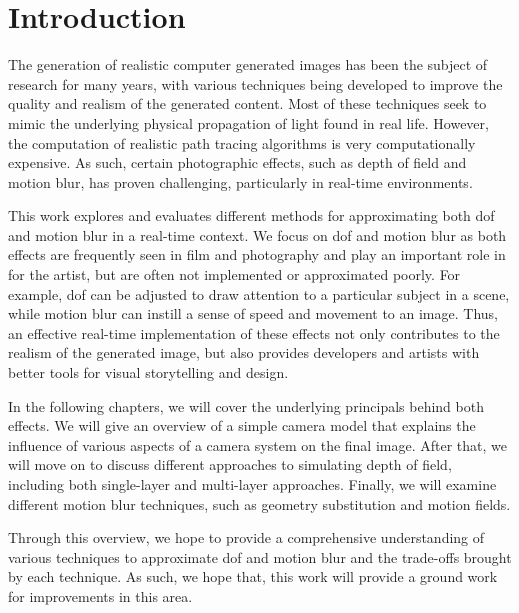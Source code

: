 \chapter{Introduction}
\label{ch:Introduction}
The generation of realistic computer generated images has been the subject of research for many years, with various techniques being developed to improve the quality and realism of the generated content.
Most of these techniques seek to mimic the underlying physical propagation of light found in real life.
However, the computation of realistic path tracing algorithms is very computationally expensive.
As such, certain photographic effects, such as depth of field and motion blur, has proven challenging, particularly in real-time environments.

This work explores and evaluates different methods for approximating both \gls{dof} and motion blur in a real-time context.
We focus on \gls{dof} and motion blur as both effects are frequently seen in film and photography and play an important role in for the artist, but are often not implemented or approximated poorly.
For example, \gls{dof} can be adjusted to draw attention to a particular subject in a scene, while motion blur can instill a sense of speed and movement to an image.
Thus, an effective real-time implementation of these effects not only contributes to the realism of the generated image, but also provides developers and artists with better tools for visual storytelling and design.

In the following chapters, we will cover the underlying principals behind both effects.
We will give an overview of a simple camera model that explains the influence of various aspects of a camera system on the final image.
After that, we will move on to discuss different approaches to simulating depth of field, including both single-layer and multi-layer approaches.
Finally, we will examine different motion blur techniques, such as geometry substitution and motion fields.

Through this overview, we hope to provide a comprehensive understanding of various techniques to approximate \gls{dof} and motion blur and the trade-offs brought by each technique.
As such, we hope that, this work will provide a ground work for improvements in this area.